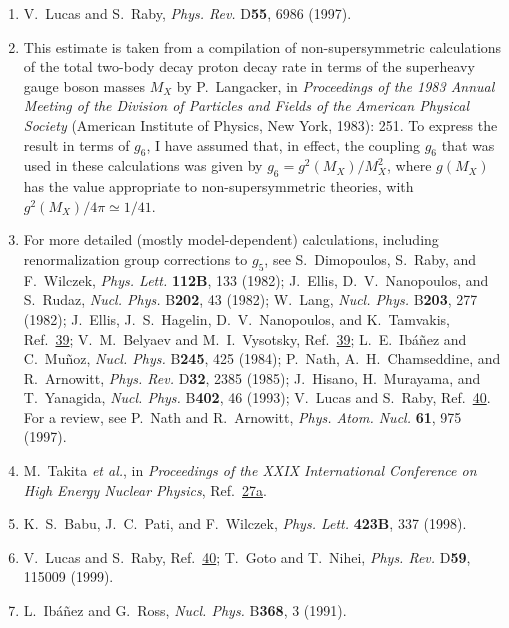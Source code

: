 \begin{enumerate}
  \item {}\label{ch28-ref-40}
  V.~Lucas and S.~Raby, \textit{Phys. Rev.} D\textbf{55}, 6986 (1997).

  \item {}\label{ch28-ref-41}
  This estimate is taken from a compilation of non-supersymmetric
  calculations of the total two-body decay proton decay rate in terms
  of the superheavy gauge boson masses $M_X$ by P.~Langacker, in
  \textit{Proceedings of the 1983 Annual Meeting of the Division of
  Particles and Fields of the American Physical Society} (American
  Institute of Physics, New York, 1983): 251. To express the result in
  terms of $g_6$, I have assumed that, in effect, the coupling $g_6$
  that was used in these calculations was given by
  $g_6=g^2(M_X)/M_X^2$, where $g(M_X)$ has the value appropriate to
  non-supersymmetric theories, with
  $g^2(M_X)/4\pi\simeq 1/41$.

  \item {}\label{ch28-ref-42}
  For more detailed (mostly model-dependent) calculations, including
  renormalization group corrections to $g_5$, see S.~Dimopoulos,
  S.~Raby, and F.~Wilczek, \textit{Phys. Lett.} \textbf{112B}, 133
  (1982); J.~Ellis, D.~V.~Nanopoulos, and S.~Rudaz,
  \textit{Nucl. Phys.} B\textbf{202}, 43 (1982); W.~Lang,
  \textit{Nucl. Phys.} B\textbf{203}, 277 (1982); J.~Ellis,
  J.~S.~Hagelin, D.~V.~Nanopoulos, and K.~Tamvakis,
  Ref.~\hyperref[ch28-ref-39]{39}; V.~M.~Belyaev and M.~I.~Vysotsky,
  Ref.~\hyperref[ch28-ref-39]{39}; L.~E.~Ib\'a\~nez and C.~Mu\~noz,
  \textit{Nucl. Phys.} B\textbf{245}, 425 (1984); P.~Nath,
  A.~H.~Chamseddine, and R.~Arnowitt, \textit{Phys. Rev.} D\textbf{32},
  2385 (1985); J.~Hisano, H.~Murayama, and T.~Yanagida,
  \textit{Nucl. Phys.} B\textbf{402}, 46 (1993); V.~Lucas and S.~Raby,
  Ref.~\hyperref[ch28-ref-40]{40}. For a review, see P.~Nath and
  R.~Arnowitt, \textit{Phys. Atom. Nucl.} \textbf{61}, 975 (1997).

  \item[42a.] \label{ch28-ref-42a}
  M.~Takita \textit{et al.}, in \textit{Proceedings of the XXIX
  International Conference on High Energy Nuclear Physics},
  Ref.~\hyperref[ch28-ref-27a]{27a}.

  \item {}\label{ch28-ref-43}
  K.~S.~Babu, J.~C.~Pati, and F.~Wilczek, \textit{Phys. Lett.}
  \textbf{423B}, 337 (1998).

  \item {}\label{ch28-ref-44}
  V.~Lucas and S.~Raby, Ref.~\hyperref[ch28-ref-40]{40}; T.~Goto and
  T.~Nihei, \textit{Phys. Rev.} D\textbf{59}, 115009 (1999).

  \item {}\label{ch28-ref-45}
  L.~Ib\'a\~nez and G.~Ross, \textit{Nucl. Phys.} B\textbf{368}, 3
  (1991).
\end{enumerate}
